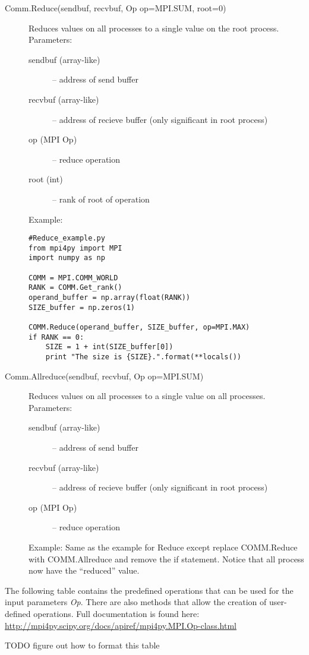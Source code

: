 \begin{description}
\item[Comm.Reduce(sendbuf, recvbuf, Op op=MPI.SUM, root=0)]
Reduces values on all processes to a single value on the root process.
Parameters:
\begin{description}
\item[sendbuf (array-like)] – address of send buffer
\item[recvbuf (array-like)] – address of recieve buffer (only significant in root process)
\item[op (MPI Op)] – reduce operation
\item[root (int)] – rank of root of operation
\end{description}
Example:
\begin{lstlisting}
#Reduce_example.py
from mpi4py import MPI
import numpy as np

COMM = MPI.COMM_WORLD
RANK = COMM.Get_rank()
operand_buffer = np.array(float(RANK))
SIZE_buffer = np.zeros(1)

COMM.Reduce(operand_buffer, SIZE_buffer, op=MPI.MAX)
if RANK == 0:
    SIZE = 1 + int(SIZE_buffer[0])
    print "The size is {SIZE}.".format(**locals())
\end{lstlisting} 
\item[Comm.Allreduce(sendbuf, recvbuf, Op op=MPI.SUM)]
Reduces values on all processes to a single value on all processes.
Parameters:
\begin{description}
\item[sendbuf (array-like)] – address of send buffer
\item[recvbuf (array-like)] – address of recieve buffer (only significant in root process)
\item[op (MPI Op)] – reduce operation
\end{description}
Example:
Same as the example for Reduce except replace COMM.Reduce with COMM.Allreduce and remove the if statement. Notice that all process now have the “reduced” value.
\end{description}

The following table contains the predefined operations that can be used for the input parameters \emph{Op}. There are also methods that allow the creation of user-defined operations. Full documentation is found here: \href{http://mpi4py.scipy.org/docs/apiref/mpi4py.MPI.Op-class.html}{http://mpi4py.scipy.org/docs/apiref/mpi4py.MPI.Op-class.html}

TODO figure out how to format this table

